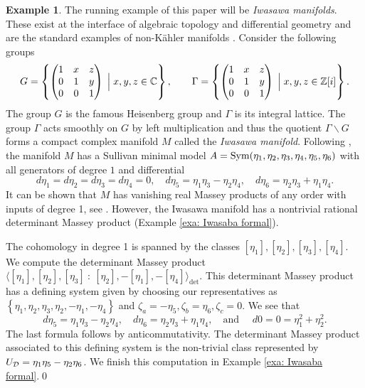 \documentclass[11pt]{article}
\theoremstyle{definition}
\newtheorem{example}[theorem]{Example}
\theoremstyle{definition}
\begin{document}
\begin{example}
\label{exa: Iwasaba}
 The running example of this paper will be \emph{Iwasawa manifolds}. 
 These exist at the interface of algebraic topology and differential geometry and are the standard examples
 of non-Kähler manifolds \cite[p. 444]{griffiths78}.
Consider the following groups
\begin{equation*}
  G =  \left\{\begin{pmatrix}
        1 &x &z
        \\
        0 & 1 &y
        \\
        0 &0 &1
    \end{pmatrix} \; \Big| \;  x, y, z \in \mathbb{C} 
    \right\}, 
    \qquad  
    \Gamma =  \left\{\begin{pmatrix}
        1 &x &z
        \\
        0 & 1 &y
        \\
        0 &0 &1
    \end{pmatrix} \; \Big| \;  x, y, z \in {\mathbb{Z}}[i] 
    \right\}.
\end{equation*} 
The group $G$ is the famous Heisenberg group and $\Gamma$ is its integral lattice. 
The group $\Gamma$ acts smoothly on $G$ by left multiplication and thus the  
quotient $\Gamma\backslash G$ forms a compact complex manifold $M$ called the \emph{Iwasawa manifold}. 
Following \cite[Section 2]{Mili24}, the manifold $M$ has a Sullivan minimal model
$A ={\operatorname{Sym}}( \eta_1, \eta_2, \eta_3, \eta_4, \eta_5, \eta_6)$ with all generators of degree $1$
and differential
\begin{equation*}
d\eta_1=d\eta_2=d\eta_3=d\eta_4=0, \quad d\eta_5 = \eta_1\eta_3- \eta_2\eta_4, \quad d\eta_6 = \eta_2\eta_3 +\eta_1\eta_4.
\end{equation*}
It can be shown that $M$ has vanishing real Massey products of any order with inputs of degree 1,
see \cite[Corollary 2.2]{Mili24}.  
However, the Iwasawa manifold has a nontrivial rational determinant Massey product (Example \ref{exa: Iwasaba formal}).

The cohomology in degree 1 is spanned by the classes $[\eta_1], [\eta_2], [\eta_3], [\eta_4].$
We compute the determinant Massey product 
$\langle [\eta_1], [\eta_2], [\eta_3] \ :\  [\eta_2], - [\eta_1], -[\eta_4] \rangle_{\det}.$
This determinant Massey product has a defining system given 
by choosing our representatives as 
$\left\{ \eta_1, \eta_2, \eta_3, \eta_2, -\eta_1,- \eta_4 \right\}$ and $ \zeta_a 
= -\eta_5, \zeta_b =  \eta_6, \zeta_c = 0$.
We see that 
\begin{equation*}
d\eta_5 = \eta_1\eta_3- \eta_2\eta_4,\quad  d\eta_6 = \eta_2\eta_3 +\eta_1\eta_4
,\quad \textrm{and } \quad d 0 = 0 
=  \eta_1^2 + \eta_2^2.
\end{equation*}
The last formula follows by anticommutativity.
The determinant Massey product associated to this defining system is 
the non-trivial class represented by $U_{\mathcal D}=\eta_1 \eta_5 - \eta_2\eta_6$. 
We finish this computation in Example \ref{exa: Iwasaba formal}.\qed
\end{example}
\end{document}
